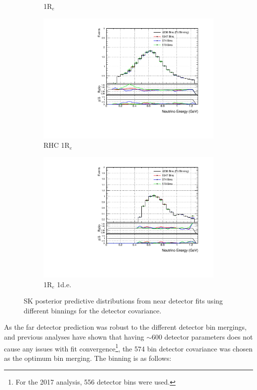 \begin{figure}
\begin{subfigure}{.49\textwidth}
  \caption{1R$_{e}$}
\end{subfigure}
\begin{subfigure}{.49\textwidth}
  \centering
  \includegraphics[width=0.95\linewidth]{figs/detbin_nuebar}
  \caption{RHC 1R$_{e}$}
\end{subfigure}
\begin{subfigure}{.49\textwidth}
  \centering
  \includegraphics[width=0.95\linewidth]{figs/detbin_nue1pi}
  \caption{1R$_{e}$ 1d.e.}
\end{subfigure}
\caption{SK posterior predictive distributions from near detector fits using different binnings for the detector covariance.}
\label{fig:detbinSK}
\end{figure}

As the far detector prediction was robust to the different detector bin mergings, and previous analyses have shown that having $\sim600$ detector parameters does not cause any issues with fit convergence\footnote{For the 2017 analysis, 556 detector bins were used.}, the 574 bin detector covariance was chosen as the optimum bin merging. The binning is as follows:

